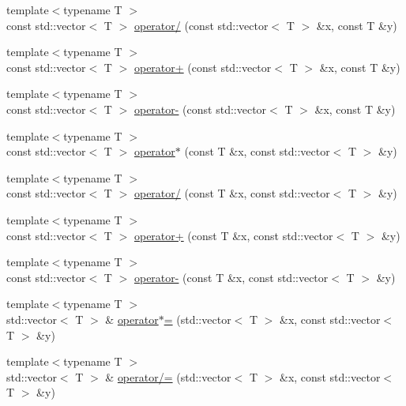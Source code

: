 \begin{DoxyCompactItemize}
\item 
{\footnotesize template$<$typename T $>$ }\\const std\+::vector$<$ T $>$ \hyperlink{contrafold_2_utilities_8ipp_a13cceb369f762a265498f2cc5c181aae}{operator/} (const std\+::vector$<$ T $>$ \&x, const T \&y)
\item 
{\footnotesize template$<$typename T $>$ }\\const std\+::vector$<$ T $>$ \hyperlink{contrafold_2_utilities_8ipp_a592ff9916895c92e5553df7e3185f49f}{operator+} (const std\+::vector$<$ T $>$ \&x, const T \&y)
\item 
{\footnotesize template$<$typename T $>$ }\\const std\+::vector$<$ T $>$ \hyperlink{contrafold_2_utilities_8ipp_abda54a09ef34c2781d786368b6248835}{operator-\/} (const std\+::vector$<$ T $>$ \&x, const T \&y)
\item 
{\footnotesize template$<$typename T $>$ }\\const std\+::vector$<$ T $>$ \hyperlink{contrafold_2_utilities_8ipp_afa57077fa69a822dfe1938396c307b81}{operator$\ast$} (const T \&x, const std\+::vector$<$ T $>$ \&y)
\item 
{\footnotesize template$<$typename T $>$ }\\const std\+::vector$<$ T $>$ \hyperlink{contrafold_2_utilities_8ipp_a223c655adedf1f1fe2acb0bf852a49a6}{operator/} (const T \&x, const std\+::vector$<$ T $>$ \&y)
\item 
{\footnotesize template$<$typename T $>$ }\\const std\+::vector$<$ T $>$ \hyperlink{contrafold_2_utilities_8ipp_a9980cc43673f8c9f685c500a1ea6e89c}{operator+} (const T \&x, const std\+::vector$<$ T $>$ \&y)
\item 
{\footnotesize template$<$typename T $>$ }\\const std\+::vector$<$ T $>$ \hyperlink{contrafold_2_utilities_8ipp_a088dbb8065fc5c3752f74d372370640b}{operator-\/} (const T \&x, const std\+::vector$<$ T $>$ \&y)
\item 
{\footnotesize template$<$typename T $>$ }\\std\+::vector$<$ T $>$ \& \hyperlink{contrafold_2_utilities_8ipp_aed2c5cbeefc6e8d3166c406f581a8654}{operator$\ast$=} (std\+::vector$<$ T $>$ \&x, const std\+::vector$<$ T $>$ \&y)
\item 
{\footnotesize template$<$typename T $>$ }\\std\+::vector$<$ T $>$ \& \hyperlink{contrafold_2_utilities_8ipp_aa2459c271ecf612a026ad273d183fb21}{operator/=} (std\+::vector$<$ T $>$ \&x, const std\+::vector$<$ T $>$ \&y)

\end{DoxyCompactItemize}
